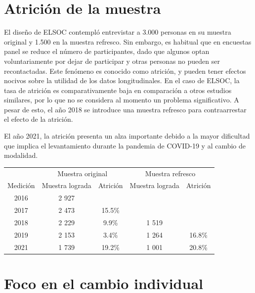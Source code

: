 \documentclass[
  12pt,
  openany]{book}
\begin{document}
\hypertarget{atriciuxf3n-de-la-muestra}{%
\chapter{Atrición de la muestra}\label{atriciuxf3n-de-la-muestra}}

El diseño de ELSOC contempló entrevistar a 3.000 personas en su muestra original y 1.500 en la muestra refresco. Sin embargo, es habitual que en encuestas panel se reduce el número de participantes, dado que algunos optan voluntariamente por dejar de participar y otras personas no pueden ser recontactadas. Este fenómeno es conocido como atrición, y pueden tener efectos nocivos sobre la utilidad de los datos longitudinales. En el caso de ELSOC, la tasa de atrición es comparativamente baja en comparación a otros estudios similares, por lo que no se considera al momento un problema significativo. A pesar de esto, el año 2018 se introduce una muestra refresco para contraarrestar el efecto de la atrición.

El año 2021, la atrición presenta un alza importante debido a la mayor dificultad que implica el levantamiento durante la pandemia de COVID-19 y al cambio de modalidad.

\begin{table}[H]
\centering\begin{table}[H]
\centering
\begin{tabular}[t]{c|c|c|c|c}
\hline
\multicolumn{1}{c|}{ } & \multicolumn{2}{c|}{Muestra original} & \multicolumn{2}{c}{Muestra refresco} \\
\cline{2-3} \cline{4-5}
Medición & Muestra lograda & Atrición & Muestra lograda & Atrición\\
\hline
2016 & 2 927 &  &  & \\
\hline
2017 & 2 473 & 15.5\% &  & \\
\hline
2018 & 2 229 & 9.9\% & 1 519 & \\
\hline
2019 & 2 153 & 3.4\% & 1 264 & 16.8\%\\
\hline
2021 & 1 739 & 19.2\% & 1 001 & 20.8\%\\
\hline
\end{tabular}
\end{table}
\end{table}

\hypertarget{foco-en-el-cambio-individual}{%
\chapter{Foco en el cambio individual}\label{foco-en-el-cambio-individual}}
\end{document}
